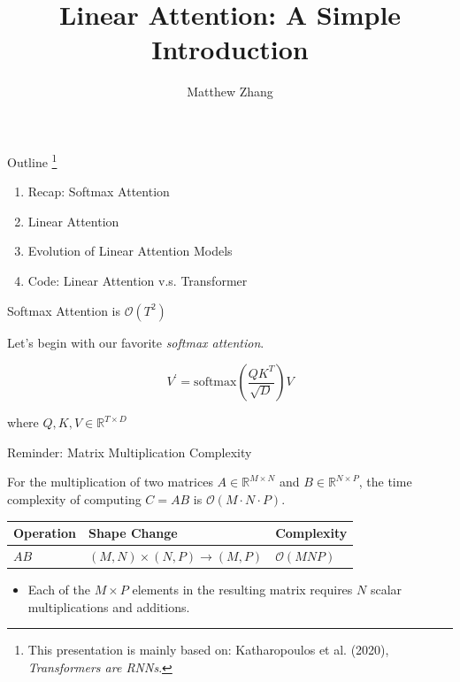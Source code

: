 \documentclass[aspectratio=169]{beamer}
\title{Linear Attention: A Simple Introduction}
\author{Matthew Zhang}
\institute{Myrtle.ai}
\date{}
\theoremstyle{definition}
\begin{document}
\begin{frame}[plain]
    \titlepage
\end{frame}





\begin{frame}{Outline    \footnote{This presentation is mainly based on: Katharopoulos et al. (2020), \textit{Transformers are RNNs}.}}
    \vspace{1em}
    \begin{enumerate}
        \setlength{\itemsep}{1em}
        \item Recap: Softmax Attention
        \item Linear Attention
        \item Evolution of Linear Attention Models
        \item Code: Linear Attention v.s. Transformer
    \end{enumerate}


\end{frame}



\begin{frame}{Softmax Attention is $\mathcal{O}(T^2)$}



Let's begin with our favorite \textit{softmax attention}.

\begin{equation}
\label{eq: softmax_attn}
V^{\prime} = \text{softmax} \left( \frac{QK^T}{\sqrt{D}} \right) V
\end{equation}


where $Q, K, V \in \mathbb{R}^{T \times D}$ 


\end{frame}



\begin{frame}{Reminder: Matrix Multiplication Complexity}

For the multiplication of two matrices $A \in \mathbb{R}^{M \times N}$ and $B \in \mathbb{R}^{N \times P}$, the time complexity of computing $C = AB$ is $\mathcal{O}(M \cdot N \cdot P)$.

\begin{center}
    \renewcommand{\arraystretch}{1.5}
    \begin{tabular}{lll}
    \toprule
    \textbf{Operation} & \textbf{Shape Change} & \textbf{Complexity} \\ \midrule
    $A B$             & $(M, N) \times (N, P) \to (M, P)$ & $\mathcal{O}(M N P)$ \\
    \bottomrule
    \end{tabular}
    \end{center}

\begin{itemize}
    \item Each of the $M \times P$ elements in the resulting matrix requires $N$ scalar multiplications and additions.
\end{itemize}

\end{frame}
\end{document}
